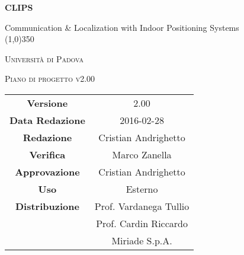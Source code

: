 \documentclass[a4paper,12pt]{article}
\author{Eduard Bicego, Federico Tavella, Andrea Tombolato}
\date{20/01/2016}
\begin{document}
	\begin{titlepage}
		\centering
		{\huge\bfseries CLIPS\par}
		Communication \& Localization with Indoor Positioning Systems \\
		\line(1,0){350} \\
		{\scshape\LARGE Università di Padova \par}
		\vspace{1cm}
		{\scshape\Large Piano di progetto v2.00\par}
		\logo
	
		\vfill \vfill
		\begin{tabular}{c|c}
			{\hfill \textbf{Versione}} 			&	2.00\\
			{\hfill\textbf{Data Redazione}} 	& 	2016-02-28\\
			{\hfill\textbf{Redazione}} 			&   Cristian Andrighetto \\ 
			{\hfill\textbf{Verifica}} 			& 	Marco Zanella 	\\
			{\hfill\textbf{Approvazione}} 		& 	Cristian Andrighetto \\
			{\hfill\textbf{Uso}} 				& Esterno			\\
			{\hfill\textbf{Distribuzione}} 		& Prof. Vardanega Tullio \\
												& Prof. Cardin Riccardo \\
												& Miriade S.p.A. \\
	\end{tabular}
\end{titlepage}

	\pagestyle{myfront}	
	
	\newpage
			
	\newpage
		\tableofcontents 	%
	\newpage
		\listoftables 		%
	\newpage	
		\listoffigures		%
	
	\label{LastFrontPage}

	\newpage
		\pagestyle{mymain}
	
	\newpage
		
	\newpage
		

	\newpage
		
		
	\newpage
		
		
	\newpage
			
		
	\newpage
			

    \newpage
		
	\newpage
		
        		
	\label{LastPage}
\end{document}
